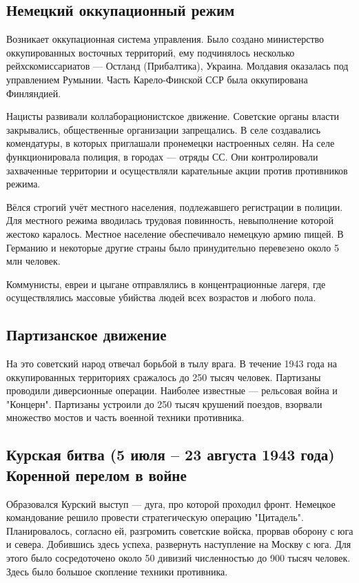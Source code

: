 \subsection{Немецкий оккупационный режим}

Возникает оккупационная система управления. Было создано министерство оккупированных восточных территорий, ему подчинялось несколько рейхскомиссариатов --- Остланд (Прибалтика), Украина. Молдавия оказалась под управлением Румынии. Часть Карело-Финской ССР была оккупирована Финляндией.

Нацисты развивали коллаборационистское движение. Советские органы власти закрывались, общественные организации запрещались. В селе создавались комендатуры, в которых приглашали пронемецки настроенных селян. На селе функционировала полиция, в городах --- отряды СС. Они контролировали захваченные территории и осуществляли карательные акции против противников режима.

Вёлся строгий учёт местного населения, подлежавшего регистрации в полиции. Для местного режима вводилась трудовая повинность, невыполнение которой жестоко каралось. Местное население обеспечивало немецкую армию пищей. В Германию и некоторые другие страны было принудительно перевезено около 5 млн человек.

Коммунисты, евреи и цыгане отправлялись в концентрационные лагеря, где осуществлялись массовые убийства людей всех возрастов и любого пола.

\subsection{Партизанское движение}

На это советский народ отвечал борьбой в тылу врага. В течение 1943 года на оккупированных территориях сражалось до 250 тысяч человек. Партизаны проводили диверсионные операции. Наиболее известные --- рельсовая война и "Концерн". Партизаны устроили до 250 тысяч крушений поездов, взорвали множество мостов и часть военной техники противника.

\subsection{Курская битва (5 июля -- 23 августа 1943 года) Коренной перелом в войне}

Образовался Курский выступ --- дуга, про которой проходил фронт. Немецкое командование решило провести стратегическую операцию "Цитадель". Планировалось, согласно ей, разгромить советские войска, прорвав оборону с юга и севера. Добившись здесь успеха, развернуть наступление на Москву с юга. Для этого было сосредоточено около 50 дивизий численностью до 900 тысяч человек. Здесь было большое скопление техники противника.

